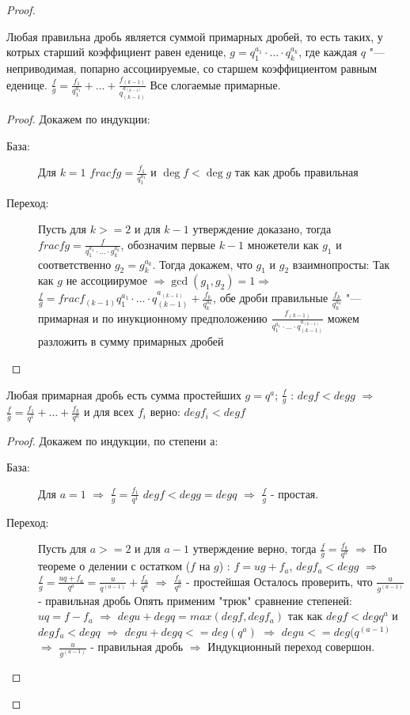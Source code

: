 \begin{theorem}{}
\begin{proof}
\begin{lemma}
Любая правильна дробь является суммой примарных дробей, то есть таких, у котрых старший
коэффициент равен еденице, $g = q_1^{a_1}\cdot\dots\cdot q_k^{a_k}$, где каждая $q$ "--- неприводимая,
попарно ассоциируемые, со старшем коэффициентом равным еденице.  
$\frac{f}{g} = \frac{f_1}{q_1^{a_1}} + \dots + \frac{f_(k-1)}{q_(k-1)^{a_(k-1)}}$
Все слогаемые примарные.
\begin{proof}
Докажем по индукции:
\begin{description}
\item[База:] Для $k = 1$
$frac{f}{g} = \frac{f_1}{q_1^{a_1}}$ и $\deg f < \deg g$ так как дробь правильная
\item[Переход:] Пусть для $k >= 2$ и для $k - 1$ утверждение доказано, тогда
$frac{f}{g} = \frac{f}{q_1^{a_1}\cdot\dots\cdot g_k^{a_k}}$, обозначим первые $k - 1$ множетели как $g_1$
и соответственно $g_2 = g_k^{a_k}$. Тогда докажем, что $g_1$ и  $g_2$ взаимнопросты:
Так как $g$ не ассоциирумое $\Rightarrow \gcd(g_1, g_2) = 1 \Rightarrow$
$\frac{f}{g} = frac{f_(k-1)}{q_1^{a_1}\cdot\dots\cdot q_(k-1)^{a_(k-1)}} + \frac{f_k}{q_k^{a_k}}$,
обе дроби правильные $\frac{f_k}{q_k^{a_k}}$ "--- примарная и по инукционному предположению
$\frac{f_(k-1)}{q_1^{a_1}\cdot\dots\cdot q_(k-1)^{a_(k-1)}}$ можем разложить в сумму примарных дробей  
\end{description}
\end{proof}
\end{lemma}

\begin{lemma}
Любая примарная дробь есть сумма простейших
$g = q^a$; $\frac{f}{g}$ : $deg f < deg g$ $\Rightarrow$
$\frac{f}{g} = \frac{f_1}{q^1} + \dots + \frac{f_k}{q^a}$
 и для всех $f_i$ верно: $deg f_i < deg f$
\begin{proof}
Докажем по индукции, по степени $а$:
\begin{description}
\item[База:] Для $a = 1$ $\Rightarrow$ $\frac{f}{g} = \frac{f_1}{q^1}$
$deg f < deg g = deg q$ $\Rightarrow$ $\frac{f}{g}$ - простая. 
\item[Переход:] Пусть для $a >= 2$ и для $a - 1$ утверждение верно, тогда 
$\frac{f}{g} = \frac{f_k}{q^a}$ $\Rightarrow$ По теореме о делении с остатком ($f$ на $g$) :
$f = ug + f_a$, $deg f_a < deg g$ $\Rightarrow$ 
$\frac{f}{g} = \frac{uq+f_a}{q^a} = \frac{u}{q^(a-1)}+\frac{f_a}{q^a}$
$\Rightarrow$ $\frac{f_a}{q^a}$ - простейшая
Осталось проверить, что $\frac{u}{g^(a-1)}$  - правильная дробь
Опять применим "трюк" сравнение степеней:
$u q = f - f_a$ $\Rightarrow$ $deg u + deg q = max(deg f, deg f_a)$
так как $deg f < deg q^a$ и $deg f_a < deg q$ $\Rightarrow$
$deg u + deg q <= deg (q^a)$ $\Rightarrow$ $deg u <= deg (q^(a - 1)$
$\Rightarrow$ $\frac{u}{g^(a-1)}$  - правильная дробь $\Rightarrow$
Индукционный переход совершон. 
\end{description}
\end{proof}
\end{lemma}
\end{proof}
\end{theorem}

